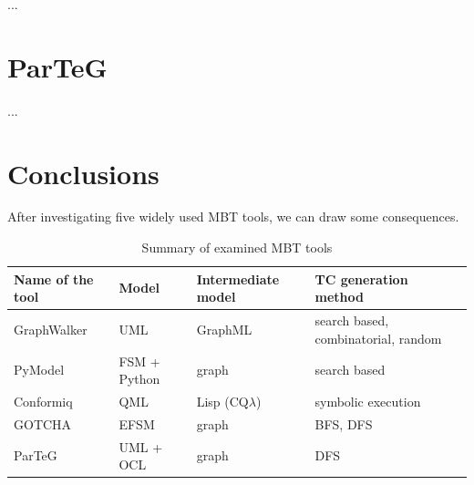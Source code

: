 ...


\section{ParTeG}
\label{sec:parteg}

...


\section{Conclusions}
\label{sec:conclusions}

After investigating five widely used MBT tools, we can draw some consequences.

\begin{table}[htb]
\begin{center}
\begin{tabular}{|l|l|l|l|}
\hline
	\textbf{Name of the tool} & \textbf{Model} & \textbf{Intermediate model} & \textbf{TC generation method}\\\hline
	GraphWalker & UML & GraphML & search based, combinatorial, random\\\hline
	PyModel & FSM + Python & graph & search based\\\hline
	Conformiq & QML & Lisp (CQ$\lambda$) & symbolic execution\\\hline
	GOTCHA & EFSM & graph & BFS, DFS\\\hline
	ParTeG & UML + OCL & graph & DFS\\
\hline
\end{tabular}
\end{center}
\caption{\label{tab:toolssummary} Summary of examined MBT tools}
\end{table}

